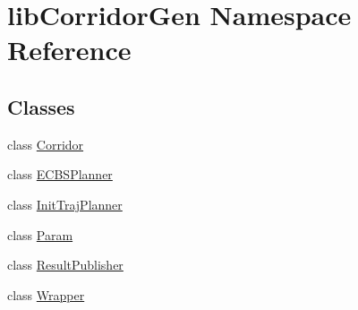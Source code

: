 \hypertarget{namespacelib_corridor_gen}{}\section{lib\+Corridor\+Gen Namespace Reference}
\label{namespacelib_corridor_gen}
\subsection*{Classes}
\begin{DoxyCompactItemize}
\item 
class \hyperlink{classlib_corridor_gen_1_1_corridor}{Corridor}
\item 
class \hyperlink{classlib_corridor_gen_1_1_e_c_b_s_planner}{E\+C\+B\+S\+Planner}
\item 
class \hyperlink{classlib_corridor_gen_1_1_init_traj_planner}{Init\+Traj\+Planner}
\item 
class \hyperlink{classlib_corridor_gen_1_1_param}{Param}
\item 
class \hyperlink{classlib_corridor_gen_1_1_result_publisher}{Result\+Publisher}
\item 
class \hyperlink{classlib_corridor_gen_1_1_wrapper}{Wrapper}
\end{DoxyCompactItemize}
